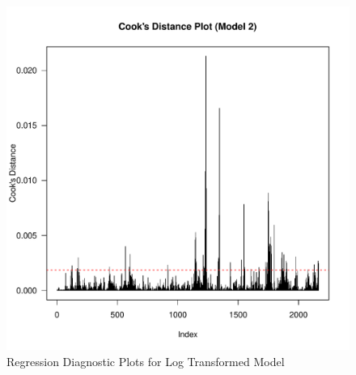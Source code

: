 \documentclass[
]{article}
\begin{document}
\begin{figure}
\centering
\includegraphics{FinalProject_files/figure-latex/model2-diagnostics-5.pdf}
\caption{Regression Diagnostic Plots for Log Transformed Model}
\end{figure}
\end{document}
